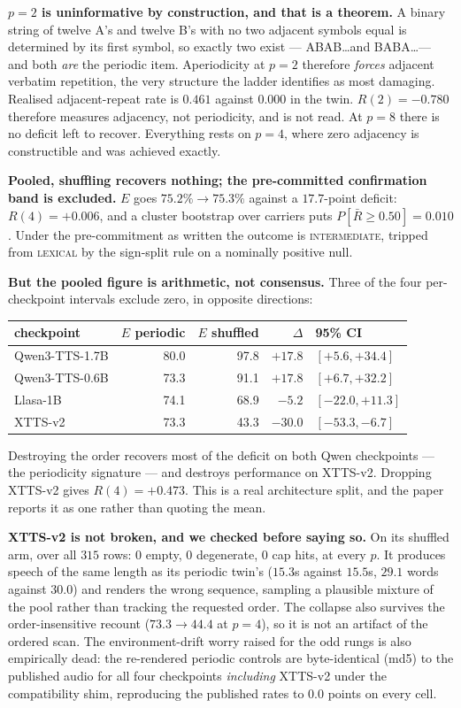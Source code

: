 \documentclass[11pt]{article}
\begin{document}
\textbf{$p{=}2$ is uninformative by construction, and that is a theorem.} A
binary string of twelve A's and twelve B's with no two adjacent symbols equal is
determined by its first symbol, so exactly two exist --- ABAB\ldots and
BABA\ldots --- and both \emph{are} the periodic item. Aperiodicity at $p{=}2$
therefore \emph{forces} adjacent verbatim repetition, the very structure the
ladder identifies as most damaging. Realised adjacent-repeat rate is $0.461$
against $0.000$ in the twin. $R(2)=-0.780$ therefore measures adjacency, not
periodicity, and is not read. At $p{=}8$ there is no deficit left
to recover. Everything rests on $p{=}4$, where zero adjacency is constructible
and was achieved exactly.

\textbf{Pooled, shuffling recovers nothing; the pre-committed confirmation band
is excluded.} $E$ goes $75.2\% \to 75.3\%$ against a $17.7$-point deficit:
$R(4) = +0.006$, and a cluster bootstrap over carriers puts
$P[\bar R \ge 0.50] = 0.010$. Under the pre-commitment as written the outcome is
\textsc{intermediate}, tripped from \textsc{lexical} by the sign-split rule on a
nominally positive null.

\textbf{But the pooled figure is arithmetic, not consensus.} Three of the four
per-checkpoint intervals exclude zero, in opposite directions:

\begin{center}
\begin{tabular}{@{}lrrrl@{}}
\toprule
checkpoint & $E$ periodic & $E$ shuffled & $\Delta$ & 95\% CI \\
\midrule
Qwen3-TTS-1.7B & 80.0 & 97.8 & $+17.8$ & $[+5.6, +34.4]$ \\
Qwen3-TTS-0.6B & 73.3 & 91.1 & $+17.8$ & $[+6.7, +32.2]$ \\
Llasa-1B       & 74.1 & 68.9 & $-5.2$  & $[-22.0, +11.3]$ \\
XTTS-v2        & 73.3 & 43.3 & $-30.0$ & $[-53.3, -6.7]$ \\
\bottomrule
\end{tabular}
\end{center}

\noindent Destroying the order recovers most of the deficit on both Qwen
checkpoints --- the periodicity signature --- and destroys performance on
XTTS-v2. Dropping XTTS-v2 gives $R(4) = +0.473$. This is a real architecture
split, and the paper reports it as one rather than quoting the mean.

\textbf{XTTS-v2 is not broken, and we checked before saying so.} On its shuffled
arm, over all $315$ rows: $0$ empty, $0$ degenerate, $0$ cap hits, at every $p$.
It produces speech of the same length as its periodic twin's ($15.3$s against
$15.5$s, $29.1$ words against $30.0$) and renders the wrong sequence, sampling a
plausible mixture of the pool rather than tracking the requested order. The
collapse also survives the order-insensitive recount ($73.3 \to 44.4$ at
$p{=}4$), so it is not an artifact of the ordered scan. The environment-drift worry raised for the odd rungs is also
empirically dead: the re-rendered periodic controls are byte-identical (md5) to
the published audio for all four checkpoints \emph{including} XTTS-v2 under the
compatibility shim, reproducing the published rates to $0.0$ points on every
cell.
\end{document}
